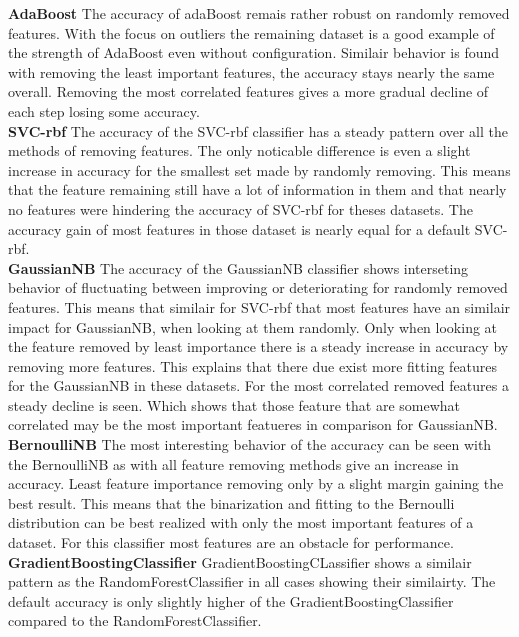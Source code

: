 \documentclass[a4paper,10pt]{article}
\begin{document}
\textbf{AdaBoost} The accuracy of adaBoost remais rather robust on randomly removed features. With the focus on outliers the remaining dataset is a good example of the strength of AdaBoost even without configuration. Similair behavior is found with removing the least important features, the accuracy stays nearly the same overall. Removing the most correlated features gives a more gradual decline of each step losing some accuracy.   \\

\textbf{SVC-rbf} The accuracy of the SVC-rbf classifier has a steady pattern over all the methods of removing features. The only noticable difference is even a slight increase in accuracy for the smallest set made by randomly removing. This means that the feature remaining still have a lot of information in them and that nearly no features were hindering the accuracy of SVC-rbf for theses datasets. The accuracy gain of most features in those dataset is nearly equal for a default SVC-rbf.   \\

\textbf{GaussianNB} The accuracy of the GaussianNB classifier shows interseting behavior of fluctuating between improving or deteriorating for randomly removed features. This means that similair for SVC-rbf that most features have an similair impact for GaussianNB, when looking at them randomly. Only when looking at the feature removed by least importance there is a steady increase in accuracy by removing more features. This explains that there due exist more fitting features for the GaussianNB in these datasets. For the most correlated removed features a steady decline is seen. Which shows that those feature that are somewhat correlated may be the most important featueres in comparison for GaussianNB. \\

\textbf{BernoulliNB} The most interesting behavior of the accuracy can be seen with the BernoulliNB as with all feature removing methods give an increase in accuracy. Least feature importance removing only by a slight margin gaining the best result. This means that the binarization and fitting to the Bernoulli distribution can be best realized with only the most important features of a dataset. For this classifier most features are an obstacle for performance. \\

\textbf{GradientBoostingClassifier} GradientBoostingCLassifier shows a similair pattern as the RandomForestClassifier in all cases showing their similairty. The default accuracy is only slightly higher of the GradientBoostingClassifier compared to the RandomForestClassifier. \\
\end{document}
